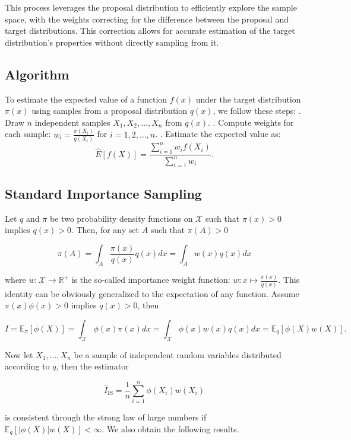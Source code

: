 \documentclass{article}
\begin{document}
This process leverages the proposal distribution to efficiently explore the sample space, with the weights correcting for the difference between the proposal and target distributions. This correction allows for accurate estimation of the target distribution’s properties without directly sampling from it.

\subsection{Algorithm}

To estimate the expected value of a function $f(x)$ under the target distribution $\pi(x)$ using samples from a proposal distribution $q(x)$, we follow these steps:
. Draw $n$ independent samples $X_1, X_2, \ldots, X_n$ from $q(x)$.
. Compute weights for each sample: $w_i = \frac{\pi(X_i)}{q(X_i)}$ for $i = 1, 2, \ldots, n$.
. Estimate the expected value as:
$$
\hat{E}[f(X)] = \frac{\sum_{i=1}^n w_i f(X_i)}{\sum_{i=1}^n w_i}.
$$


\subsection{Standard Importance Sampling}

Let \( q \) and \( \pi \) be two probability density functions on \( \mathcal{X} \) such that \( \pi(x) > 0 \) implies \( q(x) > 0 \). Then, for any set \( A \) such that \( \pi(A) > 0 \)

\[
\pi(A) = \int_A \frac{\pi(x)}{q(x)}q(x)dx = \int_A w(x)q(x)dx
\]

where \( w: \mathcal{X} \rightarrow \mathbb{R}^+ \) is the so-called importance weight function: \( w: x \mapsto \frac{\pi(x)}{q(x)} \). This identity can be obviously generalized to the expectation of any function. Assume \( \pi(x)\phi(x) > 0 \) implies \( q(x) > 0 \), then

\[
I = \mathbb{E}_{\pi}[\phi(X)] = \int_{\mathcal{X}} \phi(x) \pi(x) dx = \int_{\mathcal{X}} \phi(x) w(x) q(x) dx = \mathbb{E}_q[\phi(X)w(X)].
\]

Now let \( X_1, \ldots, X_n \) be a sample of independent random variables distributed according to \( q \), then the estimator

\[
\hat{I}_{\text{IS}} = \frac{1}{n} \sum_{i=1}^{n} \phi(X_i)w(X_i)
\]

is consistent through the strong law of large numbers if \( \mathbb{E}_q[|\phi(X)|w(X)] < \infty \). We also obtain the following results.
\end{document}

